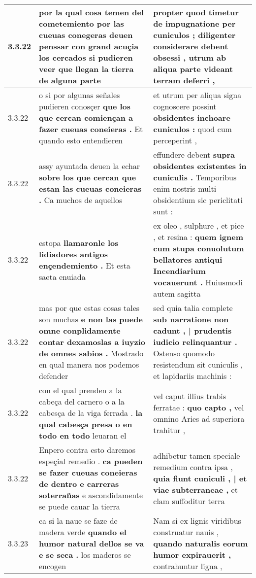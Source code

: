 \begin{tabular}{|p{1cm}|p{6.5cm}|p{6.5cm}|}
3.3.22 & por la qual cosa temen del cometemiento \textbf{ por las cueuas conegeras deuen penssar con grand acuçia los cercados } si pudieren veer que llegan la tierra de alguna parte & propter quod timetur de impugnatione per cuniculos ; \textbf{ diligenter considerare debent obsessi , } utrum ab aliqua parte videant terram deferri , \\\hline
3.3.22 & o si por algunas señales pudieren conosçer \textbf{ que los que cercan comiençan a fazer cueuas coneieras . } Et quando esto entendieren & et utrum per aliqua signa cognoscere possint \textbf{ obsidentes inchoare cuniculos : } quod cum perceperint , \\\hline
3.3.22 & assy ayuntada deuen la echar \textbf{ sobre los que cercan que estan las cueuas coneieras . } Ca muchos de aquellos & effundere debent \textbf{ supra obsidentes existentes in cuniculis . } Temporibus enim nostris multi obsidentium sic periclitati sunt : \\\hline
3.3.22 & estopa \textbf{ llamaronle los lidiadores antigos ençendemiento . } Et esta saeta enuiada & ex oleo , sulphure , et pice , et resina : \textbf{ quem ignem cum stupa conuolutum bellatores antiqui Incendiarium vocauerunt . } Huiusmodi autem sagitta \\\hline
3.3.22 & mas por que estas cosas tales son muchas \textbf{ e non las puede omne conplidamente contar dexamoslas a iuyzio de omnes sabios . } Mostrado en qual manera nos podemos defender & sed quia talia complete \textbf{ sub narratione non cadunt , | prudentis iudicio relinquantur . } Ostenso quomodo resistendum sit cuniculis , et lapidariis machinis : \\\hline
3.3.22 & con el qual prenden a la cabeça del carnero o a la cabesça de la viga ferrada . \textbf{ la qual cabesça presa o en todo en todo } leuaran el & vel caput illius trabis ferratae : \textbf{ quo capto , } vel omnino Aries ad superiora trahitur , \\\hline
3.3.22 & Enpero contra esto daremos espeçial remedio . \textbf{ ca pueden se fazer cueuas coneieras de dentro e carreras soterrañas } e ascondidamente se puede cauar la tierra & adhibetur tamen speciale remedium contra ipsa , \textbf{ quia fiunt cuniculi , | et viae subterraneae , } et clam suffoditur terra \\\hline
3.3.23 & ca si la naue se faze de madera verde \textbf{ quando el humor natural dellos se va e se seca . } los maderos se encogen & Nam si ex lignis viridibus construatur nauis , \textbf{ quando naturalis eorum humor expirauerit , } contrahuntur ligna , \\\hline

\end{tabular}
